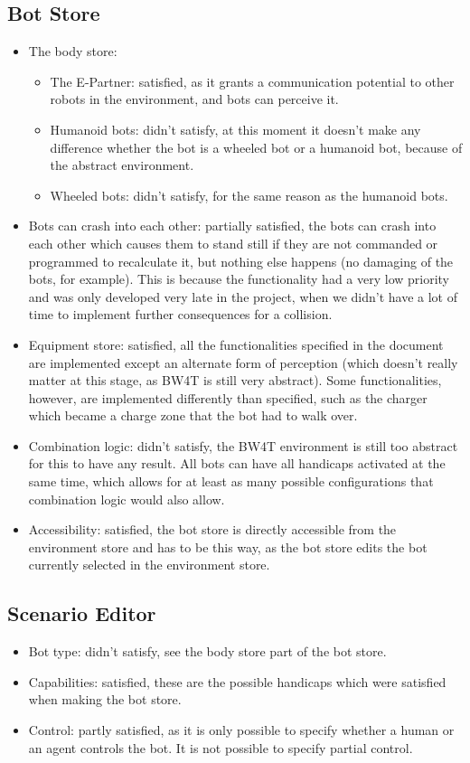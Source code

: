 \subsection*{Bot Store}
\begin{itemize}
	\item The body store:
	\begin{itemize}
		\item The E-Partner: satisfied, as it grants a communication potential to other robots in the environment, and bots can perceive it.
		\item Humanoid bots: didn't satisfy, at this moment it doesn't make any difference whether the bot is a wheeled bot or a humanoid bot, because of the abstract environment.
		\item Wheeled bots: didn't satisfy, for the same reason as the humanoid bots.
	\end{itemize}
	\item Bots can crash into each other: partially satisfied, the bots can crash into each other which causes them to stand still if they are not commanded or programmed to recalculate it, but nothing else happens (no damaging of the bots, for example). This is because the functionality had a very low priority and was only developed very late in the project, when we didn't have a lot of time to implement further consequences for a collision.
	\item Equipment store: satisfied, all the functionalities specified in the document are implemented except an alternate form of perception (which doesn't really matter at this stage, as BW4T is still very abstract). Some functionalities, however, are implemented differently than specified, such as the charger which became a charge zone that the bot had to walk over.
	\item Combination logic: didn't satisfy, the BW4T environment is still too abstract for this to have any result. All bots can have all handicaps activated at the same time, which allows for at least as many possible configurations that combination logic would also allow.
	\item Accessibility: satisfied, the bot store is directly accessible from the environment store and has to be this way, as the bot store edits the bot currently selected in the environment store.
\end{itemize}

\subsection*{Scenario Editor}
\begin{itemize}
	\item Bot type: didn't satisfy, see the body store part of the bot store.
	\item Capabilities: satisfied, these are the possible handicaps which were satisfied when making the bot store.
	\item Control: partly satisfied, as it is only possible to specify whether a human or an agent controls the bot. It is not possible to specify partial control.
\end{itemize}

